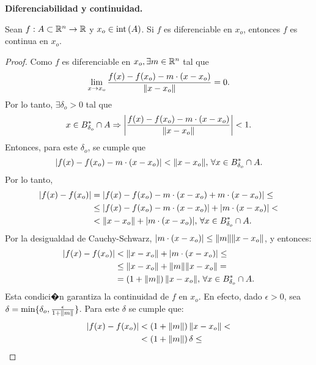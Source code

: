 \documentclass[a4paper]{scrartcl} %
\begin{document}
\begin{theorem}\textbf{Diferenciabilidad y continuidad.} \label{teo:difCont}
\mbox{}

Sean $f: A \subset \mathbb{R}^n \to \mathbb{R}$ y $x_o \in \operatorname{int}{(A)}$. Si $f$ es diferenciable en $x_o$, entonces $f$ es continua en $x_o$.
 \begin{proof}
 \mbox{}
 
 Como $f$ es diferenciable en $x_o, \exists m \in \mathbb{R}^n$ tal que
 \[
  \lim_{x \to x_o} \frac{f(x) - f(x_o) - m \cdot (x - x_o)}{\norm{x - x_o}} = 0.
 \]
Por lo tanto, $\exists \delta_o > 0$ tal que 
\[
 x \in B_{\delta_o}^* \cap A \Rightarrow 
 \abs{ \frac{f(x) - f(x_o) - m \cdot (x - x_o)}{\norm{x - x_o}} } < 1.
\]
Entonces, para este $\delta_o$, se cumple que
\[
 \abs{ f(x) - f(x_o) - m \cdot (x - x_o) } < \norm{x - x_o}, \, \forall x \in B_{\delta_o}^* \cap A.
\]
Por lo tanto,
\begin{align*}
\abs{ f(x) - f(x_o) } &=   \abs{ f(x) - f(x_o) - m \cdot (x - x_o) + m \cdot (x - x_o) } \le \\
                      &\le \abs{ f(x) - f(x_o) - m \cdot (x - x_o) } + \abs{ m \cdot (x - x_o) } < \\
                      &< \norm{x - x_o} + \abs{ m \cdot (x - x_o) }, \, 
                      \forall x \in B^*_{\delta_o} \cap A.
\end{align*}
Por la desigualdad de Cauchy-Schwarz, $\abs{ m \cdot (x - x_o) } \le \norm{m} \norm{x - x_o}$, y entonces:
\begin{align*}
\abs{ f(x) - f(x_o) } &< \norm{x - x_o} + \abs{ m \cdot (x - x_o) } \le \\
                      &\le \norm{x - x_o} + \norm{m} \norm{x - x_o} = \\
                      &=  \left( 1 + \norm{m} \right) \norm{x - x_o}, \, 
                      \forall x \in B^*_{\delta_o} \cap A.
\end{align*}
Esta condici�n garantiza la continuidad de $f$ en $x_o$. En efecto, dado $\epsilon > 0$, sea $\delta = \min \{\delta_o, \frac{\epsilon}{1 + \norm{m}} \}$. Para este $\delta$ se cumple que:
\begin{align*}
 \abs{ f(x) - f(x_o) } &< \left( 1 + \norm{m} \right) \norm{x - x_o} < \\
                       &<   \left( 1 + \norm{m} \right) \delta \le \\

\end{align*}
\end{proof}
\end{theorem}
\end{document}
